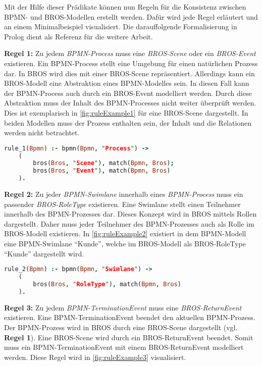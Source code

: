 Mit der Hilfe dieser Prädikate können nun Regeln für die Konsistenz zwischen BPMN- und BROS-Modellen erstellt werden.
Dafür wird jede Regel erläutert und an einem Minimalbeispiel visualisiert.
Die darauffolgende Formalisierung in Prolog dient als Referenz für die weitere Arbeit.



\textbf{Regel 1:} 
Zu jedem \emph{BPMN-Process} muss eine \emph{BROS-Scene} oder ein \emph{BROS-Event} existieren.
Ein BPMN-Process stellt eine Umgebung für einen natürlichen Prozess dar.
In BROS wird dies mit einer BROS-Scene repräsentiert.
Allerdings kann ein BROS-Modell eine Abstraktion eines BPMN-Modelles sein.
In diesen Fall kann der BPMN-Process auch durch ein BROS-Event modelliert werden.
Durch diese Abstraktion muss der Inhalt des BPMN-Processes nicht weiter überprüft werden.
Dies ist exemplarisch in \cref{fig:ruleExample1} für eine BROS-Scene dargestellt.
In beiden Modellen muss der Prozess enthalten sein, der Inhalt und die Relationen werden nicht betrachtet.

\begin{lstlisting}[language=Prolog, caption=Formalisierung der Regel 1, label=lst:rule_1]
rule_1(Bpmn) :- bpmn(Bpmn, "Process") ->
    (
        bros(Bros, "Scene"), match(Bpmn, Bros);
        bros(Bros, "Event"), match(Bpmn, Bros)
    ).
\end{lstlisting}

\textbf{Regel 2:}
Zu jeder \emph{BPMN-Swimlane} innerhalb eines \emph{BPMN-Process} muss ein passender \emph{BROS-RoleType} existieren.
Eine Swimlane stellt einen Teilnehmer innerhalb des BPMN-Prozesses dar. 
Dieses Konzept wird in BROS mittels Rollen dargestellt.
Daher muss jeder Teilnehmer des BPMN-Prozesses auch als Rolle im BROS-Modell existieren.
In \cref{fig:ruleExample2} existiert in dem BPMN-Modell eine BPMN-Swimlane ``Kunde'', welche im BROS-Modell als BROS-RoleType ``Kunde'' dargestellt wird.

\begin{lstlisting}[language=Prolog, caption=Formalisierung der Regel 2, label=lst:rule_2]
rule_2(Bpmn) :- bpmn(Bpmn, "Swimlane") ->
    (
        bros(Bros, "RoleType"), match(Bpmn, Bros)
    ).
\end{lstlisting}

\textbf{Regel 3:}
Zu jedem \emph{BPMN-TerminationEvent} muss eine \emph{BROS-ReturnEvent} existieren.
Eine BPMN-TerminationEvent beendet den aktuellen BPMN-Prozess.
Der BPMN-Prozess wird in BROS durch eine BROS-Scene dargestellt (vgl. \textbf{Regel 1}).
Eine BROS-Scene wird durch ein BROS-ReturnEvent beendet.
Somit muss ein BPMN-TerminationEvent mit einem BROS-ReturnEvent modelliert werden.
Diese Regel wird in \cref{fig:ruleExample3} visualisiert.

